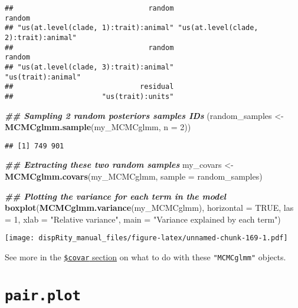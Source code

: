 \documentclass[
]{book}
\newenvironment{Shaded}{\begin{snugshade}}{\end{snugshade}}
\newcommand{\AttributeTok}[1]{\textcolor[rgb]{0.13,0.29,0.53}{#1}}
\newcommand{\ConstantTok}[1]{\textcolor[rgb]{0.56,0.35,0.01}{#1}}
\newcommand{\DecValTok}[1]{\textcolor[rgb]{0.00,0.00,0.81}{#1}}
\newcommand{\DocumentationTok}[1]{\textcolor[rgb]{0.56,0.35,0.01}{\textbf{\textit{#1}}}}
\newcommand{\FunctionTok}[1]{\textcolor[rgb]{0.13,0.29,0.53}{\textbf{#1}}}
\newcommand{\NormalTok}[1]{#1}
\newcommand{\OtherTok}[1]{\textcolor[rgb]{0.56,0.35,0.01}{#1}}
\newcommand{\StringTok}[1]{\textcolor[rgb]{0.31,0.60,0.02}{#1}}
\begin{document}
\begin{verbatim}
##                                random                                random 
## "us(at.level(clade, 1):trait):animal" "us(at.level(clade, 2):trait):animal" 
##                                random                                random 
## "us(at.level(clade, 3):trait):animal"                    "us(trait):animal" 
##                              residual 
##                     "us(trait):units"
\end{verbatim}

\begin{Shaded}
\begin{Highlighting}[]
\DocumentationTok{\#\# Sampling 2 random posteriors samples IDs}
\NormalTok{(random\_samples }\OtherTok{\textless{}{-}} \FunctionTok{MCMCglmm.sample}\NormalTok{(my\_MCMCglmm, }\AttributeTok{n =} \DecValTok{2}\NormalTok{))}
\end{Highlighting}
\end{Shaded}

\begin{verbatim}
## [1] 749 901
\end{verbatim}

\begin{Shaded}
\begin{Highlighting}[]
\DocumentationTok{\#\# Extracting these two random samples}
\NormalTok{my\_covars }\OtherTok{\textless{}{-}} \FunctionTok{MCMCglmm.covars}\NormalTok{(my\_MCMCglmm, }\AttributeTok{sample =}\NormalTok{ random\_samples)}

\DocumentationTok{\#\# Plotting the variance for each term in the model}
\FunctionTok{boxplot}\NormalTok{(}\FunctionTok{MCMCglmm.variance}\NormalTok{(my\_MCMCglmm), }\AttributeTok{horizontal =} \ConstantTok{TRUE}\NormalTok{, }\AttributeTok{las =} \DecValTok{1}\NormalTok{,}
        \AttributeTok{xlab =} \StringTok{"Relative variance"}\NormalTok{,}
        \AttributeTok{main =} \StringTok{"Variance explained by each term"}\NormalTok{)}
\end{Highlighting}
\end{Shaded}

\texttt{[image: dispRity\_manual\_files/figure-latex/unnamed-chunk-169-1.pdf]}

See more in the \protect\hyperlink{covar}{\texttt{\$covar} section} on what to do with these \texttt{"MCMCglmm"} objects.

\hypertarget{pair.plot}{%
\section{\texorpdfstring{\texttt{pair.plot}}{pair.plot}}\label{pair.plot}}
\end{document}
